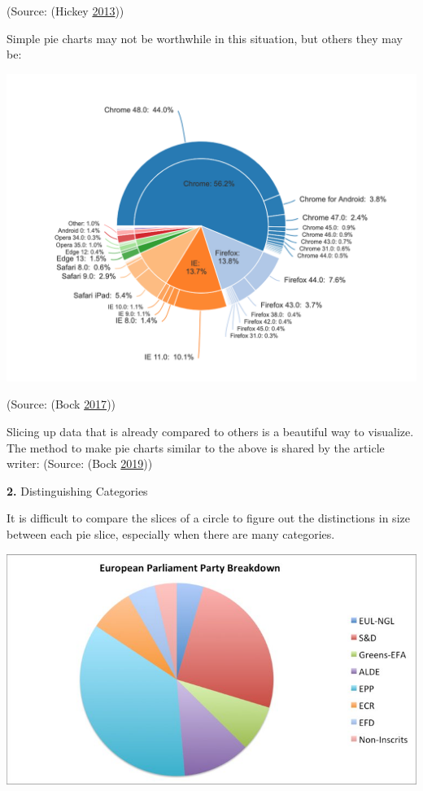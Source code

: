 \documentclass[]{book}
\begin{document}
(Source: (Hickey \protect\hyperlink{ref-hickey-pie-worst}{2013}))

Simple pie charts may not be worthwhile in this situation, but others they may be:

\includegraphics{images/Beautiful-Pie-Chart.png}

(Source: (Bock \protect\hyperlink{ref-Pro-Pie-charts}{2017}))

Slicing up data that is already compared to others is a beautiful way to visualize. The method to make pie charts similar to the above is shared by the article writer: (Source: (Bock \protect\hyperlink{ref-displayr-create-pie-charts}{2019}))

\textbf{2.} Distinguishing Categories

It is difficult to compare the slices of a circle to figure out the distinctions in size between each pie slice, especially when there are many categories.

\includegraphics{images/hickey-breakdown.jpg}
\end{document}
